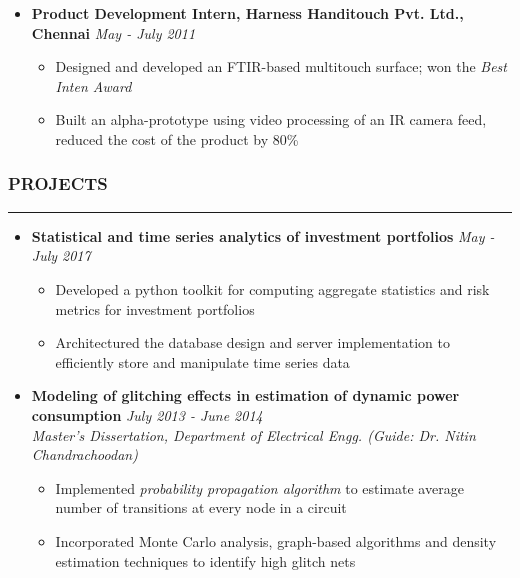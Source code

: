 \documentclass[10pt,a4paper,English]{article}
\newcommand\roottitle[1]{\vspace{-4mm}\subsubsection*{\uppercase{#1}}\vspace{-0.3em}\nopagebreak[4]\hrule\vspace{4mm}}
\newcommand\itemyear[1]{\hfill \emph{\color{itemyear} #1}}
\newcommand\itemenv{\setlength\itemsep{0.5pt} \addtolength{\itemindent}{-5mm}\vspace{-1.5mm}}
\begin{document}
\begin{itemize}
    \item \textbf{Product Development Intern, Harness Handitouch Pvt. Ltd., Chennai} \itemyear{May - July 2011}
        \begin{itemize} \itemenv
            \item Designed and developed an FTIR-based multitouch surface; won the \textit{Best Inten Award}
            \item Built an alpha-prototype using video processing of an IR camera feed, reduced the cost of the product by 80\%
        \end{itemize}

    \end{itemize}

\roottitle{Projects}
\begin{itemize} \itemenv
    \item \textbf{Statistical and time series analytics of investment portfolios} \itemyear{May - July 2017}
        \begin{itemize} \itemenv
            \item Developed a python toolkit for computing aggregate statistics and risk metrics for investment portfolios
            \item Architectured the database design and server implementation to efficiently store and manipulate time series data
        \end{itemize}
    \item \textbf{Modeling of glitching effects in estimation of dynamic power consumption} \itemyear{July 2013 - June 2014} \\
    \emph{Master's Dissertation, Department of Electrical Engg. (Guide: Dr. Nitin Chandrachoodan)}
        \begin{itemize} \itemenv
            \item Implemented \textit{probability propagation algorithm} to estimate average number of transitions at every node in a circuit
            \item Incorporated Monte Carlo analysis, graph-based algorithms and density estimation techniques to identify high glitch nets
        \end{itemize}
\end{itemize}
\end{document}
